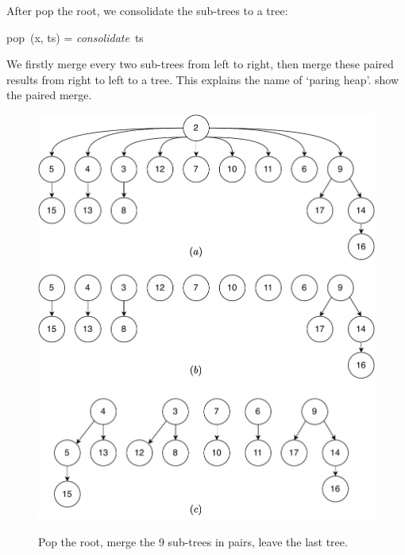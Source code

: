 \documentclass[b5paper]{article}
\begin{document}
After pop the root, we consolidate the sub-trees to a tree:

\be
pop\ (x, ts) = \textit{consolidate}\ ts
\ee

We firstly merge every two sub-trees from left to right, then merge these paired results from right to left to a tree. This explains the name of `paring heap'.  show the paired merge.

\begin{figure}[htbp]
  \centering
  \includegraphics[scale=0.5]{img/pairs-merge} \\
  \caption{Pop the root, merge the 9 sub-trees in pairs, leave the last tree.}
  \label{fig:merge-pairs}
\end{figure}
\end{document}
